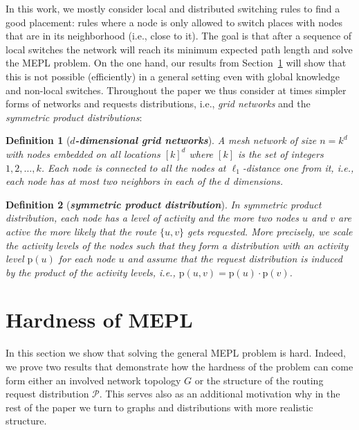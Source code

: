 \documentclass[conference]{IEEEtran}
\def\p{\mathrm{p}}
\def\Pc{\mathcal{P}}
\newtheorem{definition}{Definition}
\begin{document}
In this work, we mostly consider local and distributed switching rules to find a good placement: rules where a node is only allowed to switch places with nodes that are in its neighborhood (i.e., close to it). The goal is that after a sequence of local switches the network will reach its minimum expected path length and solve the MEPL problem.
On the one hand, our results from Section~\ref{sec:hardness} will show that this is not possible (efficiently) in a general setting even with global knowledge and non-local switches. Throughout the paper we thus consider at times simpler forms of networks and requests distributions, i.e., \emph{grid networks} and the \emph{symmetric product distributions}:

\begin{definition}[\bf \emph{$d$-dimensional grid networks}] A mesh network of size $n=k^d$ with nodes embedded on all locations 
$[k]^d$ where $[k]$ is the set of integers $1, 2, \dots, k$.
Each node is connected to all the nodes at $\ell_1$-distance one from it, i.e., each node has at most two neighbors in each of the $d$ dimensions.
\end{definition}

\begin{definition}[\bf \emph{symmetric product distribution}]\label{dfn:indep_sym_distr}
In symmetric product distribution, each node has a level of activity and the more two nodes $u$ and $v$ are active the more likely that the route $\{u,v\}$ gets requested. More precisely, we scale the activity levels of the nodes such that they form a distribution with an activity level $\p(u)$ for each node $u$ and assume that the request distribution is induced by the product of the activity levels, i.e., $\p(u,v) = \p(u) \cdot \p(v)$.
\end{definition}




\section{Hardness of MEPL}\label{sec:hardness}

In this section we show that solving the general MEPL problem is hard. Indeed, we prove two results that demonstrate how the hardness of the problem can come form either an involved network topology $G$ or the structure of the routing request distribution $\Pc$. This serves also as an additional motivation why in the rest of the paper we turn to graphs and  distributions with more realistic structure.
\end{document}
